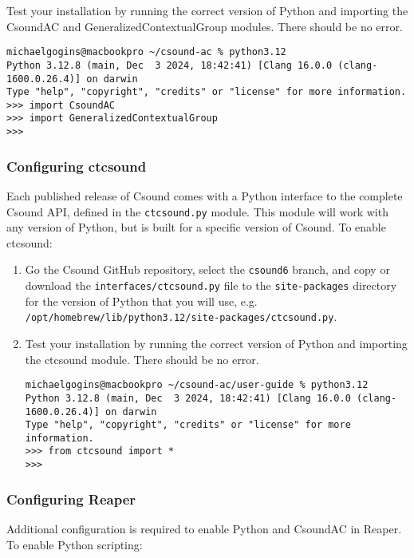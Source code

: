 \documentclass[letterpaper,10pt,DIV=12,parskip=half]{scrartcl}
\begin{document}
Test your installation by running the correct version of Python and importing the CsoundAC and GeneralizedContextualGroup modules. There should be no error.

\begin{lstlisting}[basicstyle=\small\ttfamily]
michaelgogins@macbookpro ~/csound-ac % python3.12
Python 3.12.8 (main, Dec  3 2024, 18:42:41) [Clang 16.0.0 (clang-1600.0.26.4)] on darwin
Type "help", "copyright", "credits" or "license" for more information.
>>> import CsoundAC
>>> import GeneralizedContextualGroup
>>> 
\end{lstlisting}

\subsubsection{Configuring ctcsound}

Each published release of Csound comes with a Python interface to the complete Csound API, defined in the \lstinline|ctcsound.py| module. This module will work with any version of Python, but is built for a specific version of Csound. To enable ctcsound:

\begin{enumerate}
\item Go the Csound GitHub repository, select the \lstinline|csound6| branch, and copy or download the \lstinline|interfaces/ctcsound.py| file to the \lstinline|site-packages| directory for the version of Python that you will use, e.g. \lstinline|/opt/homebrew/lib/python3.12/site-packages/ctcsound.py|.
\item Test your installation by running the correct version of Python and importing the ctcsound module. There should be no error.

\begin{lstlisting}[basicstyle=\small\ttfamily]
michaelgogins@macbookpro ~/csound-ac/user-guide % python3.12
Python 3.12.8 (main, Dec  3 2024, 18:42:41) [Clang 16.0.0 (clang-1600.0.26.4)] on darwin
Type "help", "copyright", "credits" or "license" for more information.
>>> from ctcsound import *
>>> 
\end{lstlisting}

\end{enumerate}

\subsubsection{Configuring Reaper}

Additional configuration is required to enable Python and CsoundAC in Reaper. To enable Python scripting:
\end{document}
